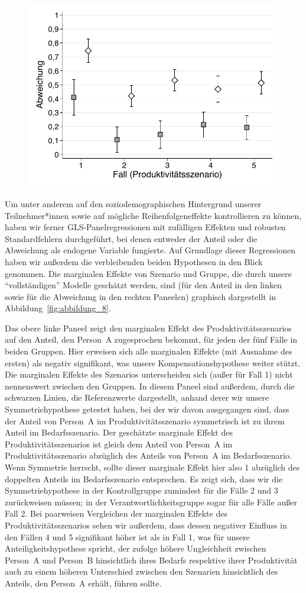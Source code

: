\documentclass[justified,nobib,nohyper,symmetric,twoside]{tufte-book}
\begin{document}
\begin{figure}[t]
   \includegraphics[width=0.49\linewidth]{figure_7_f.pdf}
\end{figure}

Um unter anderem auf den soziodemographischen Hintergrund unserer Teilnehmer*innen sowie auf mögliche Reihenfolgeneffekte kontrollieren zu können, haben wir ferner GLS-Panelregressionen mit zufälligen Effekten und robusten Standardfehlern durchgeführt, bei denen entweder der Anteil oder die Abweichung als endogene Variable fungierte.
Auf Grundlage dieser Regressionen haben wir außerdem die verbleibenden beiden Hypothesen in den Blick genommen.
Die marginalen Effekte von Szenario und Gruppe, die durch unsere \enquote{vollständigen} Modelle geschätzt werden, sind (für den Anteil in den linken sowie für die Abweichung in den rechten Paneelen) graphisch dargestellt in Abbildung~\ref{fig:abbildung_8}.

Das obere linke Paneel zeigt den marginalen Effekt des Produktivitätsszenarios auf den Anteil, den Person~A zugesprochen bekommt, für jeden der fünf Fälle in beiden Gruppen.
Hier erweisen sich alle marginalen Effekte (mit Ausnahme des ersten) als negativ signifikant, was unsere Kompensationshypothese weiter stützt.
Die marginalen Effekte des Szenarios unterscheiden sich (außer für Fall 1) nicht nennenswert zwischen den Gruppen.
In diesem Paneel sind außerdem, durch die schwarzen Linien, die Referenzwerte dargestellt, anhand derer wir unsere Symmetriehypothese getestet haben, bei der wir davon ausgegangen sind, dass der Anteil von Person~A im Produktivitätsszenario symmetrisch ist zu ihrem Anteil im Bedarfs\-szenario.
Der geschätzte marginale Effekt des Produktivitätsszenarios ist gleich dem Anteil von Person~A im Produktivitätsszenario abzüglich des Anteils von Person~A im Bedarfs\-szenario.
Wenn Symmetrie herrscht, sollte dieser marginale Effekt hier also 1 abzüglich des doppelten Anteils im Bedarfsszenario entsprechen.
Es zeigt sich, dass wir die Symmetriehypothese in der Kontrollgruppe zumindest für die Fälle 2 und 3 zurückweisen müssen; in der Verantwortlichkeitsgruppe sogar für alle Fälle außer Fall 2.
Bei paarweisen Vergleichen der marginalen Effekte des Produktivitätsszenarios sehen wir außerdem, dass dessen negativer Einfluss in den Fällen 4 und 5 signifikant höher ist als in Fall 1, was für unsere Anteiligkeitshypothese spricht, der zufolge höhere Ungleichheit zwischen Person~A und Person~B hinsichtlich ihres Bedarfs respektive ihrer Produktivität auch zu einem höheren Unterschied zwischen den Szenarien hinsichtlich des Anteils, den Person~A erhält, führen sollte.
\end{document}
